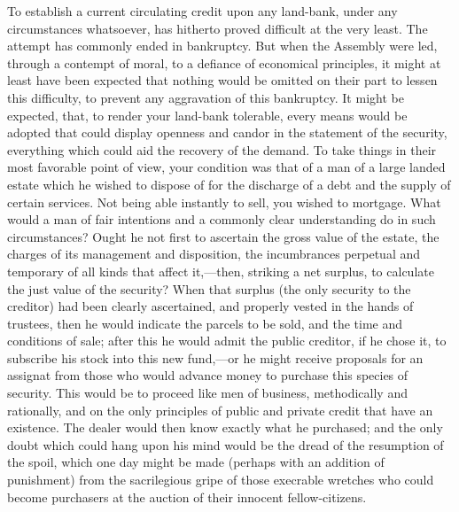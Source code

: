 To establish a current circulating credit upon any land-bank, under any circumstances whatsoever, has hitherto proved difficult at the very least. The attempt has commonly ended in bankruptcy. But when the Assembly were led, through a contempt of moral, to a defiance of economical principles, it might at least have been expected that nothing would be omitted on their part to lessen this difficulty, to prevent any aggravation of this bankruptcy. It might be expected, that, to render your land-bank tolerable, every means would be adopted that could display openness and candor in the statement of the security, everything which could aid the recovery of the demand. To take things in their most favorable point of view, your condition was that of a man of a large landed estate which he wished to dispose of for the discharge of a debt and the supply of certain services. Not being able instantly to sell, you wished to mortgage. What would a man of fair intentions and a commonly clear understanding do in such circumstances? Ought he not first to ascertain the gross value of the estate, the charges of its management and disposition, the incumbrances perpetual and temporary of all kinds that affect it,—then, striking a net surplus, to calculate the just value of the security? When that surplus (the only security to the creditor) had been clearly ascertained, and properly vested in the hands of trustees, then he would indicate the parcels to be sold, and the time and conditions of sale; after this he would admit the public creditor, if he chose it, to subscribe his stock into this new fund,—or he might receive proposals for an assignat from those who would advance money to purchase this species of security. This would be to proceed like men of business, methodically and rationally, and on the only principles of public and private credit that have an existence. The dealer would then know exactly what he purchased; and the only doubt which could hang upon his mind would be the dread of the resumption of the spoil, which one day might be made (perhaps with an addition of punishment) from the sacrilegious gripe of those execrable wretches who could become purchasers at the auction of their innocent fellow-citizens.

